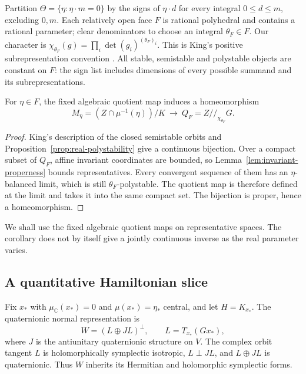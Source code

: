 Partition $\Theta=\{\eta:\eta\cdot m=0\}$ by the signs of $\eta\cdot d$
for every integral $0\le d\le m$, excluding $0,m$. Each relatively
open face $F$ is rational polyhedral and contains a rational parameter;
clear denominators to choose an integral $\theta_F\in F$.
Our character is
$\chi_{\theta_F}(g)=\prod_i\det(g_i)^{(\theta_F)_i}$.
This is King's positive subrepresentation convention
\cite[Propositions~3.1 and 3.2]{King94}.
All stable, semistable and polystable objects are constant on $F$:
the sign list includes dimensions of every possible summand and
its subrepresentations.

\begin{corollary}\label{cor:fixed-face}
For $\eta\in F$, the fixed algebraic quotient map induces a
homeomorphism
\[
 M_\eta=(Z\cap\mu^{-1}(\eta))/K
       \ \longrightarrow\ Q_F=Z/\!/_{\chi_{\theta_F}}G.
\]
\end{corollary}
\begin{proof}
King's description of the closed semistable orbits and
Proposition~\ref{prop:real-polystability} give a continuous bijection.
Over a compact subset of $Q_F$, affine invariant coordinates are
bounded, so Lemma~\ref{lem:invariant-properness} bounds representatives.
Every convergent sequence of them has an $\eta$-balanced limit,
which is still $\theta_F$-polystable. The quotient map is therefore
defined at the limit and takes it into the same compact set.
The bijection is proper, hence a homeomorphism.
\end{proof}
We shall use the fixed algebraic quotient maps on representative
spaces. The corollary does not by itself give a jointly continuous
inverse as the real parameter varies.

\subsection{A quantitative Hamiltonian slice}
Fix $x_*$ with $\mu_{\mathbb C}(x_*)=0$ and $\mu(x_*)=\eta_*$
central, and let $H=K_{x_*}$.
The quaternionic normal representation is
\[
 W=(L\oplus JL)^\perp,\qquad L=T_{x_*}(Gx_*),
\]
where $J$ is the antiunitary quaternionic structure on $V$.
The complex orbit tangent $L$ is holomorphically symplectic isotropic,
$L\perp JL$, and $L\oplus JL$ is quaternionic. Thus $W$ inherits
its Hermitian and holomorphic symplectic forms.


